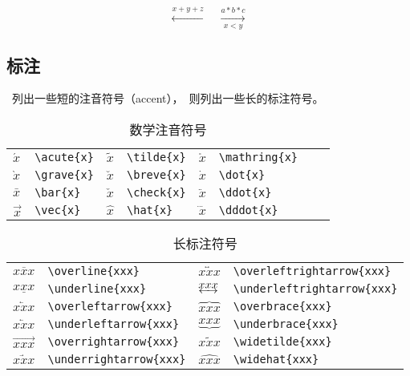 \begin{demo}
\[\xleftarrow{x+y+z}\quad
\xrightarrow[x<y]{a*b*c}\]
\end{demo}

\subsection{标注}
~列出一些短的注音符号（accent），~则列出一些长的标注符号。

\begin{table}[htbp]
\caption{数学注音符号}
\label{tab:accent}
\centering
\begin{tabular}{llllllll}
    \toprule
    $\acute{x}$ & \verb|\acute{x}| & $\tilde{x}$   & \verb|\tilde{x}|   & $\mathring{x}$   & \verb|\mathring{x}|  \\
    $\grave{x}$ & \verb|\grave{x}| & $\breve{x}$ & \verb|\breve{x}| & $\dot{x}$   & \verb|\dot{x}|    \\
    $\bar{x}$  & \verb|\bar{x}|  & $\check{x}$ & \verb|\check{x}| & $\ddot{x}$  & \verb|\ddot{x}|  \\
    $\vec{x}$ & \verb|\vec{x}| & $\hat{x}$   & \verb|\hat{x}|   & $\dddot{x}$ & \verb|\dddot{x}| \\
    \bottomrule
\end{tabular}
\end{table}

\begin{table}[htbp]
\caption{长标注符号}
\label{tab:notation}
\centering
\begin{tabular}{llll}
    \toprule
    $\overline{xxx}$        & \verb|\overline{xxx}|        & $\overleftrightarrow{xxx}$  & \verb|\overleftrightarrow{xxx}| \\
    $\underline{xxx}$       & \verb|\underline{xxx}|       & $\underleftrightarrow{xxx}$ & \verb|\underleftrightarrow{xxx}| \\
    $\overleftarrow{xxx}$   & \verb|\overleftarrow{xxx}|   & $\overbrace{xxx}$           & \verb|\overbrace{xxx}| \\
    $\underleftarrow{xxx}$  & \verb|\underleftarrow{xxx}|  & $\underbrace{xxx}$          & \verb|\underbrace{xxx}| \\
    $\overrightarrow{xxx}$  & \verb|\overrightarrow{xxx}|  & $\widetilde{xxx}$           & \verb|\widetilde{xxx}| \\
    $\underrightarrow{xxx}$ & \verb|\underrightarrow{xxx}| & $\widehat{xxx}$             & \verb|\widehat{xxx}| \\
    \bottomrule
\end{tabular}
\end{table}

